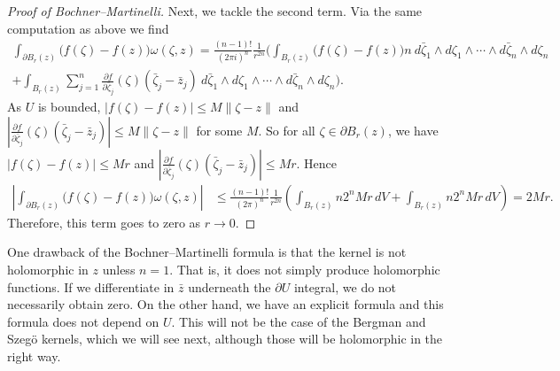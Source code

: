 \documentclass[12pt,openany]{book}
\newcommand{\snorm}[1]{\lVert {#1} \rVert}
\newcommand{\abs}[1]{\left\lvert {#1} \right\rvert}
\theoremstyle{plain}
\theoremstyle{remark}
\theoremstyle{definition}
\theoremstyle{exercise}
\theoremstyle{example}
\begin{document}
\begin{proof}[Proof of Bochner--Martinelli]
Next, we tackle the second term.
Via the same computation as above we find
\begin{multline*}
\int_{\partial B_r(z)}
\bigl(f(\zeta)-f(z)\bigr)
\omega(\zeta,z)
=
\frac{(n-1)!}{{(2\pi i)}^n}\frac{1}{r^{2n}}
\Biggl(
\int_{B_r(z)}
\bigl(f(\zeta)-f(z)\bigr)
n~
d\bar{\zeta}_1 \wedge d\zeta_1 \wedge
\cdots \wedge
d\bar{\zeta}_n \wedge d\zeta_n
\\
+
\int_{B_r(z)}
\sum_{j=1}^n
\frac{\partial f}{\partial \bar{\zeta}_j}(\zeta)
(\bar{\zeta}_j-\bar{z}_j)
~
d\bar{\zeta}_1 \wedge d\zeta_1 \wedge
\cdots \wedge
d\bar{\zeta}_n \wedge d\zeta_n \Biggr).
\end{multline*}
As $U$ is bounded, $\abs{f(\zeta)-f(z)} \leq M
\snorm{\zeta-z}$
and
$\abs{\frac{\partial f}{\partial \bar{\zeta}_j}(\zeta)
(\bar{\zeta}_j-\bar{z}_j)} \leq M \snorm{\zeta-z}$ for some $M$.
So 
for all $\zeta \in \partial B_r(z)$,
we have
$\abs{f(\zeta)-f(z)} \leq Mr$
and $\abs{\frac{\partial f}{\partial \bar{\zeta}_j}(\zeta)
(\bar{\zeta}_j-\bar{z}_j)} \leq Mr$.
Hence
\begin{equation*}
\begin{split}
\abs{
\int_{\partial B_r(z)}
\bigl(f(\zeta)-f(z)\bigr)
\omega(\zeta,z)
}
& \leq
\frac{(n-1)!}{{(2\pi)}^n}\frac{1}{r^{2n}}
\left(
\int_{B_r(z)}
n 2^n Mr \, dV
+
\int_{B_r(z)}
n 2^n Mr \, dV
\right)
=
2 M r .
\end{split}
\end{equation*}
Therefore, this term goes to zero as $r \to 0$.
\end{proof}

One drawback of the Bochner--Martinelli formula is that the kernel is not
holomorphic in $z$ unless $n=1$.  That is, it does not simply produce
holomorphic functions.  If we differentiate in $\bar{z}$ underneath the
$\partial U$ integral, we do not necessarily obtain zero.
On the other hand, we have an explicit formula and this formula does not
depend on $U$.  This will not be the case of the Bergman and Szeg\"o
kernels, which we will see next, although those will be holomorphic in the
right way.
\end{document}

